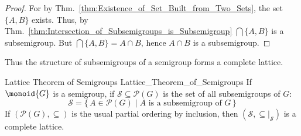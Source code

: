         \begin{proof}
            For by Thm.~\ref{thm:Existence_of_Set_Built_from_Two_Sets}, the set
            $\{A,B\}$ exists. Thus, by
            Thm.~\ref{thm:Intersection_of_Subsemigroups_is_Subsemigroup}
            $\bigcap\{A,B\}$ is a subsemigroup. But
            $\bigcap\{A,B\}=A\cap{B}$, hence $A\cap{B}$ is a subsemigroup.
        \end{proof}
        Thus the structure of subsemigroups of a semigroup forms a complete
        lattice.
        \begin{ltheorem}{Lattice Theorem of Semigroups}
                        {Lattice_Theorem_of_Semigroups}
            If $\monoid{G}$ is a semigroup, if
            $\mathcal{S}\subseteq\mathcal{P}(G)$ is the set of all subsemigroups
            of $G$:
            \begin{equation}
                \mathcal{S}=\{\,A\in\mathcal{P}(G)\;|\;
                    A\textrm{ is a subsemigroup of }G\,\}
            \end{equation}
            If $(\mathcal{P}(G),\subseteq)$ is the usual partial ordering by
            inclusion, then $(\mathcal{S},\subseteq|_{\mathcal{S}})$ is a
            complete lattice.
        \end{ltheorem}
